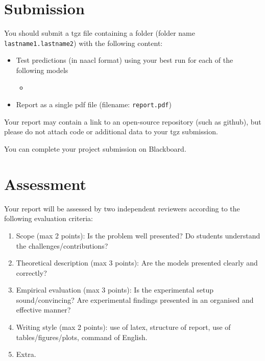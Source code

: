 \section{Submission}

You should submit a tgz file containing a folder (folder name {\tt lastname1.lastname2}) with the following content: 
\begin{itemize}
	\item Test predictions (in naacl format) using your best run for each of the following models
	\begin{itemize}
		\item 
	\end{itemize}
	\item Report as a single pdf file (filename: {\tt report.pdf})
\end{itemize}

Your report may contain a link to an open-source repository (such as github), but please do not attach code or additional data to your tgz submission.

You can complete your project submission on Blackboard.


\section{Assessment}

Your report will be assessed by two independent reviewers according to the following evaluation criteria:
\begin{enumerate}
	\item Scope (max 2 points): Is the problem well presented? Do students understand the challenges/contributions?
	\item Theoretical description (max 3 points): Are the models presented clearly and correctly?
	\item Empirical evaluation (max 3 points): Is the experimental setup sound/convincing? Are experimental findings presented in an organised and effective manner? 
	\item Writing style (max 2 points): use of latex, structure of report, use of tables/figures/plots, command of English.	
	\item Extra.
\end{enumerate}



